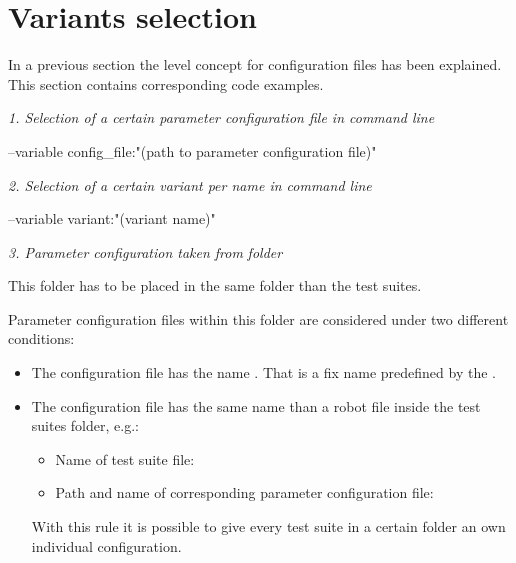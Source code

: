 \newpage

\section{Variants selection}

In a previous section the level concept for configuration files has been explained. This section contains corresponding code examples.

\textit{1. Selection of a certain parameter configuration file in command line}

\begin{robotlog}
--variable config_file:"(path to parameter configuration file)"
\end{robotlog}

\textit{2. Selection of a certain variant per name in command line}

\begin{robotlog}
--variable variant:"(variant name)"
\end{robotlog}

\textit{3. Parameter configuration taken from}  \textit{folder}

This  folder has to be placed in the same folder than the test suites.

Parameter configuration files within this folder are considered under two different conditions:

\begin{itemize}
   \item The configuration file has the name . That is a fix name predefined by the \pkg.
   \item The configuration file has the same name than a robot file inside the test suites folder, e.g.:
         \begin{itemize}
            \item Name of test suite file: 
            \item Path and name of corresponding parameter configuration file: 
         \end{itemize}
         With this rule it is possible to give every test suite in a certain folder an own individual configuration.
\end{itemize}

\newpage

